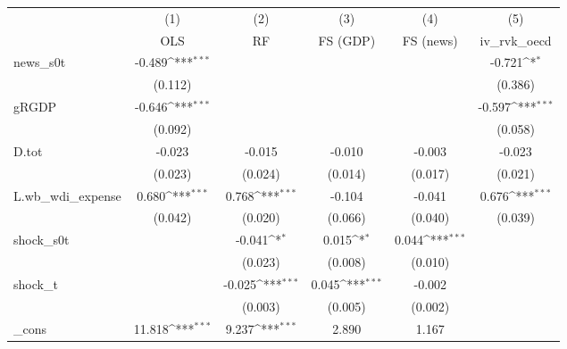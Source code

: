 {
\def\sym#1{\ifmmode^{#1}\else\(^{#1}\)\fi}
\begin{tabular}{l*{5}{c}}
\toprule
            &\multicolumn{1}{c}{(1)}&\multicolumn{1}{c}{(2)}&\multicolumn{1}{c}{(3)}&\multicolumn{1}{c}{(4)}&\multicolumn{1}{c}{(5)}\\
            &\multicolumn{1}{c}{OLS}&\multicolumn{1}{c}{RF}&\multicolumn{1}{c}{FS (GDP)}&\multicolumn{1}{c}{FS (news)}&\multicolumn{1}{c}{iv\_rvk\_oecd}\\
\midrule
news\_s0t    &      -0.489\sym{***}&                     &                     &                     &      -0.721\sym{*}  \\
            &     (0.112)         &                     &                     &                     &     (0.386)         \\
\addlinespace
gRGDP       &      -0.646\sym{***}&                     &                     &                     &      -0.597\sym{***}\\
            &     (0.092)         &                     &                     &                     &     (0.058)         \\
\addlinespace
D.tot       &      -0.023         &      -0.015         &      -0.010         &      -0.003         &      -0.023         \\
            &     (0.023)         &     (0.024)         &     (0.014)         &     (0.017)         &     (0.021)         \\
\addlinespace
L.wb\_wdi\_expense&       0.680\sym{***}&       0.768\sym{***}&      -0.104         &      -0.041         &       0.676\sym{***}\\
            &     (0.042)         &     (0.020)         &     (0.066)         &     (0.040)         &     (0.039)         \\
\addlinespace
shock\_s0t   &                     &      -0.041\sym{*}  &       0.015\sym{*}  &       0.044\sym{***}&                     \\
            &                     &     (0.023)         &     (0.008)         &     (0.010)         &                     \\
\addlinespace
shock\_t     &                     &      -0.025\sym{***}&       0.045\sym{***}&      -0.002         &                     \\
            &                     &     (0.003)         &     (0.005)         &     (0.002)         &                     \\
\addlinespace
\_cons      &      11.818\sym{***}&       9.237\sym{***}&       2.890         &       1.167         &                     \\

\end{tabular}}
